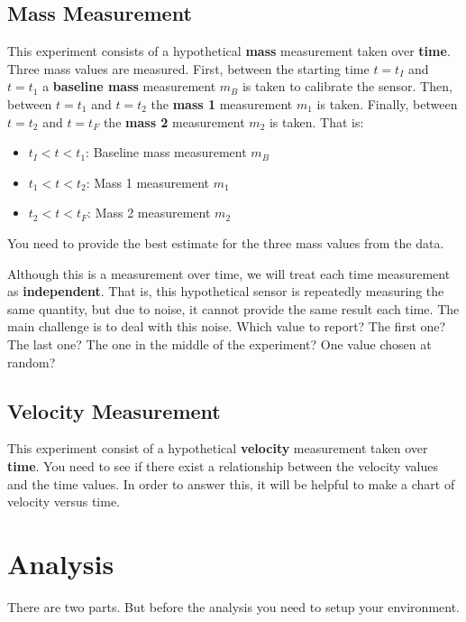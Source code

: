 \subsection{Mass Measurement}
This experiment consists of a hypothetical \textbf{mass} measurement taken over \textbf{time}. Three mass values are measured. First, between the starting time $t = t_{I}$ and $t = t_{1}$ a \textbf{baseline mass} measurement $m_{B}$ is taken to calibrate the sensor. Then, between $t = t_{1}$ and $t = t_{2}$ the \textbf{mass 1} measurement $m_{1}$ is taken. Finally, between $t = t_{2}$ and $t = t_{F}$ the \textbf{mass 2} measurement $m_{2}$ is taken. That is:
\begin{itemize}
    \item $t_{I} < t < t_{1}$: Baseline mass measurement $m_{B}$
    \item $t_{1} < t < t_{2}$: Mass 1 measurement $m_{1}$
    \item $t_{2} < t < t_{F}$: Mass 2 measurement $m_{2}$
\end{itemize}
You need to provide the best estimate for the three mass values from the data.

Although this is a measurement over time, we will treat each time measurement as \textbf{independent}. That is, this hypothetical sensor is repeatedly measuring the same quantity, but due to noise, it cannot provide the same result each time. The main challenge is to deal with this noise. Which value to report? The first one? The last one? The one in the middle of the experiment? One value chosen at random?
\subsection{Velocity Measurement}
This experiment consist of a hypothetical \textbf{velocity} measurement taken over \textbf{time}. You need to see if there exist a relationship between the velocity values and the time values. In order to answer this, it will be helpful to make a chart of velocity versus time.
\section{Analysis}
There are two parts. But before the analysis you need to setup your environment.
